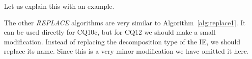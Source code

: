Let us explain this with an example. 

The other \emph{REPLACE} algorithms are very similar to Algorithm~\ref{alg:replace1}. It can be used directly for CQ10c, but for CQ12 we should make a small modification. Instead of replacing the decomposition type of the IE, we should replace its name. Since this is a very minor modification we have omitted it here.